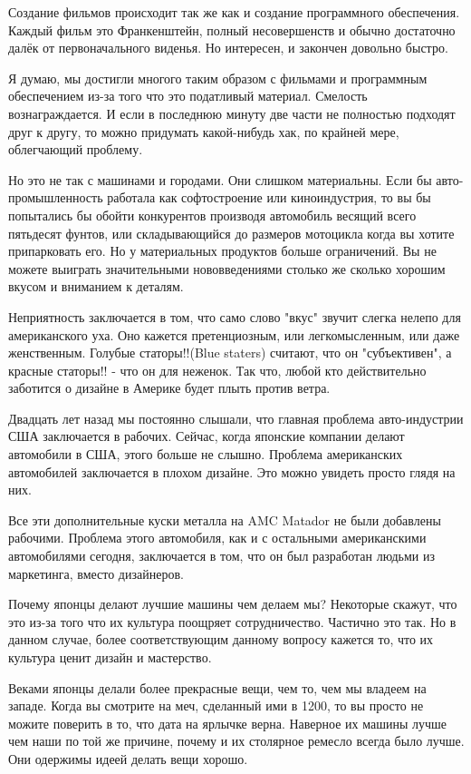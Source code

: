 \documentclass[ebook,12pt,oneside,openany]{memoir}
\begin{document}
Создание фильмов происходит так же как и создание программного
обеспечения. Каждый фильм это Франкенштейн, полный несовершенств и
обычно достаточно далёк от первоначального виденья. Но интересен, и
закончен довольно быстро.

Я думаю, мы достигли многого таким образом с фильмами и программным
обеспечением из-за того что это податливый материал. Смелость
вознаграждается. И если в последнюю минуту две части не полностью
подходят друг к другу, то можно придумать какой-нибудь хак, по крайней
мере, облегчающий проблему.

Но это не так с машинами и городами. Они слишком материальны. Если бы
авто-промышленность работала как софтостроение или киноиндустрия, то
вы бы попытались бы обойти конкурентов производя автомобиль весящий
всего пятьдесят фунтов, или складывающийся до размеров мотоцикла когда
вы хотите припарковать его. Но у материальных продуктов больше
ограничений. Вы не можете выиграть значительными нововведениями
столько же сколько хорошим вкусом и вниманием к деталям.

Неприятность заключается в том, что само слово "вкус" звучит слегка
нелепо для американского уха. Оно кажется претенциозным, или
легкомысленным, или даже женственным. Голубые статоры!!(Blue staters)
считают, что он "субъективен", а красные статоры!! - что он для
неженок. Так что, любой кто действительно заботится о дизайне в
Америке будет плыть против ветра.

Двадцать лет назад мы постоянно слышали, что главная проблема
авто-индустрии США заключается в рабочих. Сейчас, когда японские
компании делают автомобили в США, этого больше не слышно. Проблема
американских автомобилей заключается в плохом дизайне. Это можно
увидеть просто глядя на них.

Все эти дополнительные куски металла на AMC Matador не были добавлены
рабочими. Проблема этого автомобиля, как и с остальными американскими
автомобилями сегодня, заключается в том, что он был разработан людьми
из маркетинга, вместо дизайнеров.

Почему японцы делают лучшие машины чем делаем мы? Некоторые скажут,
что это из-за того что их культура поощряет сотрудничество. Частично
это так. Но в данном случае, более соответствующим данному вопросу
кажется то, что их культура ценит дизайн и мастерство.

Веками японцы делали более прекрасные вещи, чем то, чем мы владеем на
западе. Когда вы смотрите на меч, сделанный ими в 1200, то вы просто
не можите поверить в то, что дата на ярлычке верна. Наверное их машины
лучше чем наши по той же причине, почему и их столярное ремесло всегда
было лучше. Они одержимы идеей делать вещи хорошо.
\end{document}
